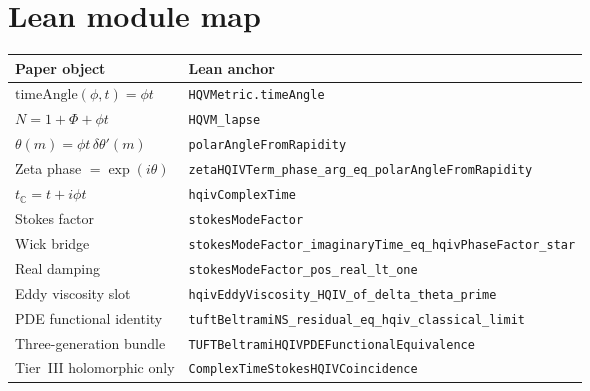 \documentclass[11pt]{amsart}
\newcommand{\leanid}[1]{\nolinkurl{#1}}
\begin{document}
\section*{Lean module map}

\begin{center}
\small
\begin{tabular}{@{}ll@{}}
\toprule
Paper object & Lean anchor \\
\midrule
$\mathrm{timeAngle}(\phi,t)=\phi t$ & \leanid{HQVMetric.timeAngle} \\
$N=1+\Phi+\phi t$ & \leanid{HQVM_lapse} \\
$\theta(m)=\phi t\,\delta\theta'(m)$ & \leanid{polarAngleFromRapidity} \\
Zeta phase $=\exp(i\theta)$ & \leanid{zetaHQIVTerm_phase_arg_eq_polarAngleFromRapidity} \\
$t_{\mathbb C}=t+i\phi t$ & \leanid{hqivComplexTime} \\
Stokes factor & \leanid{stokesModeFactor} \\
Wick bridge & \leanid{stokesModeFactor_imaginaryTime_eq_hqivPhaseFactor_star} \\
Real damping & \leanid{stokesModeFactor_pos_real_lt_one} \\
Eddy viscosity slot & \leanid{hqivEddyViscosity_HQIV_of_delta_theta_prime} \\
PDE functional identity & \leanid{tuftBeltramiNS_residual_eq_hqiv_classical_limit} \\
Three-generation bundle & \leanid{TUFTBeltramiHQIVPDEFunctionalEquivalence} \\
Tier~III holomorphic only & \leanid{ComplexTimeStokesHQIVCoincidence} \\
\bottomrule
\end{tabular}
\end{center}



\end{document}
